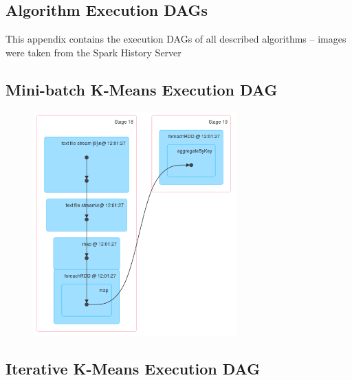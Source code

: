 \documentclass{l4proj}
\begin{document}
\begin{appendices}

\chapter{Algorithm Execution DAGs}

This appendix contains the execution DAGs of all described algorithms -- images were taken from the Spark History Server

\section{Mini-batch K-Means Execution DAG}

\begin{figure}[H]
	\centering
    \includegraphics[width=0.70\textwidth]{images/DAG3}
    \label{fig:dag3}
\end{figure}

\section{Iterative K-Means Execution DAG}


\end{appendices}
\end{document}
